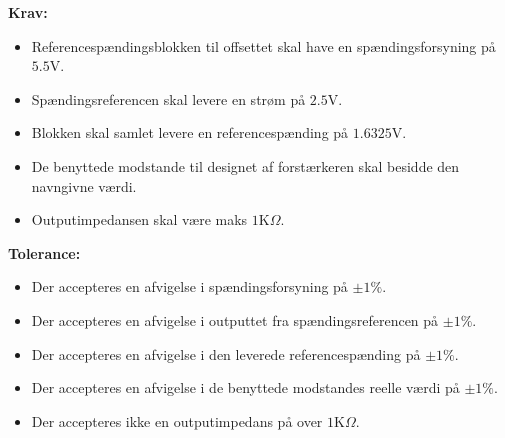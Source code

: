 \textbf{Krav:}
\begin{itemize}
	\item Referencespændingsblokken til offsettet skal have en spændingsforsyning på $5.5$V.
	\item Spændingsreferencen skal levere en strøm på $2.5$V.
	\item Blokken skal samlet levere en referencespænding på $1.6325$V.
	\item De benyttede modstande til designet af forstærkeren skal besidde den navngivne værdi.
	\item Outputimpedansen skal være maks $1$K$\Omega$.
\end{itemize}
\noindent \textbf{Tolerance:}
\begin{itemize}
	\item Der accepteres en afvigelse i spændingsforsyning på $\pm1\%$.
	\item Der accepteres en afvigelse i outputtet fra spændingsreferencen på $\pm1\%$.
	\item Der accepteres en afvigelse i den leverede referencespænding på $\pm1\%$. 
	\item Der accepteres en afvigelse i de benyttede modstandes reelle værdi på $\pm1\%$.
	\item Der accepteres ikke en outputimpedans på over $1$K$\Omega$.
\end{itemize}
